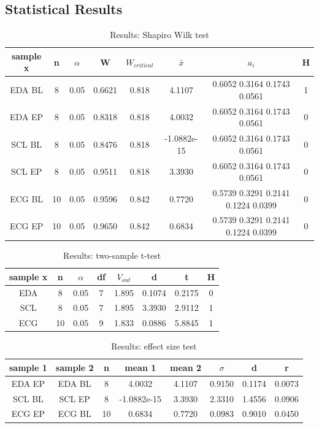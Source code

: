 \newpage
\begin{landscape}
\section{Statistical Results}

\begin{table}[h]
\centering
\caption{Results: Shapiro Wilk test}
\begin{tabular}{|c|c|c|c|c|c|c|c|}
\hline
sample x & n & $\alpha$ & W & $W_{critical}$ & $\bar{x}$ & $a_{i}$ & H\\
\hline
EDA BL & 8 & 0.05 &  0.6621 & 0.818 & 4.1107 & 0.6052 0.3164 0.1743 0.0561 & 1\\
\hline
EDA EP & 8 & 0.05 &  0.8318 & 0.818 & 4.0032 & 0.6052 0.3164 0.1743 0.0561 & 0\\
\hline
SCL BL & 8 & 0.05 &  0.8476 & 0.818 & -1.0882e-15 & 0.6052 0.3164 0.1743 0.0561 & 0\\
\hline
SCL EP & 8 & 0.05 &  0.9511 & 0.818 & 3.3930 & 0.6052 0.3164 0.1743 0.0561 & 0\\
\hline
ECG BL & 10 & 0.05 & 0.9596 & 0.842 & 0.7720 & 0.5739 0.3291 0.2141 0.1224 0.0399 & 0\\
\hline
ECG EP & 10 & 0.05 & 0.9650 & 0.842 & 0.6834 & 0.5739 0.3291 0.2141 0.1224 0.0399 & 0\\ 
\hline	
\end{tabular}
\label{shapirowilk}
\end{table}


\thispagestyle{empty}
\clearpage
\end{landscape}

\newpage

\begin{table}[h]
\centering
\caption{Results: two-sample t-test}
\begin{tabular}{|c|c|c|c|c|c|c|c|}
\hline
sample x & n & $\alpha$ & df & $V_{out}$ & d & t & H\\
\hline
EDA  & 8 & 0.05 &  7 & 1.895 & 0.1074 & 0.2175 & 0\\
\hline
SCL  & 8 & 0.05 &  7 & 1.895 & 3.3930 & 2.9112 & 1\\
\hline
ECG  & 10 & 0.05 & 9 & 1.833 & 0.0886 & 5.8845 & 1\\
\hline	
\end{tabular}
\label{ttest}
\end{table}

\begin{table}[h]
\centering
\caption{Results: effect size test}
\begin{tabular}{|c|c|c|c|c|c|c|c|}
\hline
sample 1& sample 2 & n & mean 1 & mean 2 & $\sigma$ & d & r\\
\hline
EDA EP & EDA BL & 8 & 4.0032 & 4.1107  & 0.9150  & 0.1174 & 0.0073 \\
\hline
SCL BL & SCL EP & 8 & -1.0882e-15 &  3.3930 & 2.3310 & 1.4556 & 0.0906 \\
\hline
ECG EP & ECG BL & 10 & 0.6834 & 0.7720 & 0.0983 & 0.9010 & 0.0450 \\
\hline	
\end{tabular}
\label{effecttest}
\end{table}
